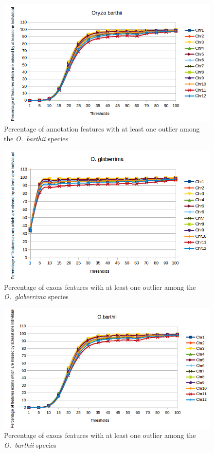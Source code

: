 \documentclass[10pt,letterpaper]{article}
\begin{document}
\begin{figure}
\centering
 \includegraphics[scale=0.7]{determinationSeuilsJusqua100MSU7R_Ob.png}
 \caption{Percentage of annotation features with at least one outlier among the \emph{O.~barthii} species}
 \label{SeuilsOB}
\end{figure}

\begin{figure}
\centering
 \includegraphics[scale=0.7]{determinationSeuilsJusqua100MSU7R_ExF_Og.png}
 \caption{Percentage of exons features with at least one outlier among the \emph{O.~glaberrima} species}
 \label{SeuilsExF_OG}
\end{figure}

\begin{figure}
\centering
 \includegraphics[scale=0.7]{determinationSeuilsJusqua100MSU7R_ExF_Ob.png}
 \caption{Percentage of exons features with at least one outlier among the \emph{O.~barthii} species}
 \label{SeuilsExF_OB}
\end{figure}
\end{document}
